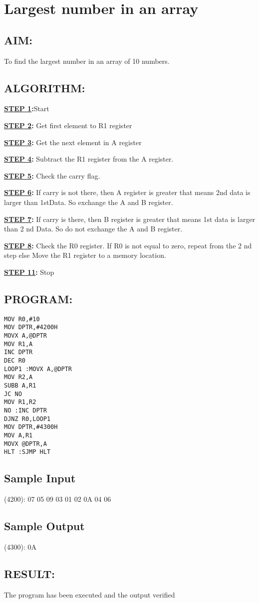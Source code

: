 \chapter{ Largest number in an array}
%
%
%
%
\section*{AIM:}
To find the largest number in an array of 10 numbers.

\section*{ALGORITHM:}
\textbf{\underline{STEP 1}:}Start

\textbf{\underline{STEP 2}:} Get first element to R1 register

\textbf{\underline{STEP 3}:}  Get the next element in A register

\textbf{\underline{STEP 4}:} Subtract the R1 register from the A register.

\textbf{\underline{STEP 5}:}  Check the carry flag.

\textbf{\underline{STEP 6}:} If carry is not there, then A register is greater that means 2nd data is larger than
1stData. So exchange the A and B register.

\textbf{\underline{STEP 7}:}  If carry is there, then B register is greater that means 1st data is larger than 2
nd Data. So do not exchange the A and B register.

\textbf{\underline{STEP 8}:}  Check the R0 register. If R0 is not equal to zero, repeat from the 2
nd step else Move the R1 register to a memory location.

\textbf{\underline{STEP 11}:} Stop


\section*{PROGRAM:}

\begin{lstlisting}
MOV R0,#10
MOV DPTR,#4200H
MOVX A,@DPTR
MOV R1,A
INC DPTR
DEC R0
LOOP1 :MOVX A,@DPTR
MOV R2,A
SUBB A,R1
JC NO
MOV R1,R2
NO :INC DPTR
DJNZ R0,LOOP1
MOV DPTR,#4300H
MOV A,R1
MOVX @DPTR,A
HLT :SJMP HLT
\end{lstlisting}

\section*{Sample Input}
(4200): 07 05 09 03 01 02 0A 04 06

\section*{Sample Output}
(4300): 0A

\section*{RESULT:}
The program has been executed and the output verified
%
%
%
%
